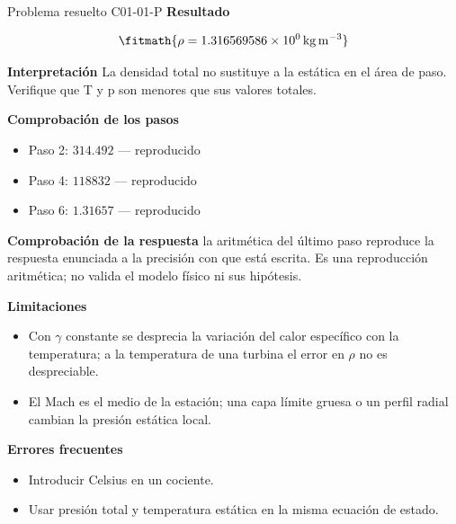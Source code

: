 \documentclass[10pt,openany]{book}
\begin{document}
\begin{studiumworked}{Problema resuelto C01-01-P}
\noindent\textbf{Resultado}

\[
\fitmath{\rho=1.316569586\times10^{0}\,\mathrm{kg}\,\mathrm{m}^{-3}}
\]

\noindent\textbf{Interpretación}
La densidad total no sustituye a la estática en el área de paso. Verifique que T y p son menores que sus valores totales.

\noindent\textbf{Comprobación de los pasos}
\begin{itemize}
\item Paso 2: $314.492$ — reproducido
\item Paso 4: $118832$ — reproducido
\item Paso 6: $1.31657$ — reproducido
\end{itemize}

\noindent\textbf{Comprobación de la respuesta} la aritmética del último paso reproduce la respuesta enunciada a la precisión con que está escrita. Es una reproducción aritmética; no valida el modelo físico ni sus hipótesis.

\noindent\textbf{Limitaciones}
\begin{itemize}
\item Con $\gamma$ constante se desprecia la variación del calor específico con la temperatura; a la temperatura de una turbina el error en $\rho$ no es despreciable.
\item El Mach es el medio de la estación; una capa límite gruesa o un perfil radial cambian la presión estática local.
\end{itemize}

\noindent\textbf{Errores frecuentes}
\begin{itemize}
\item Introducir Celsius en un cociente.
\item Usar presión total y temperatura estática en la misma ecuación de estado.
\end{itemize}
\end{studiumworked}
\end{document}
